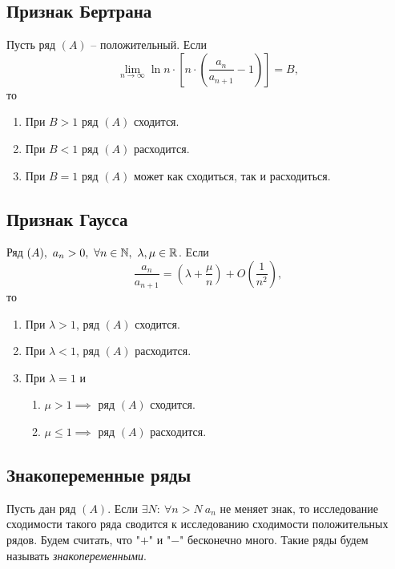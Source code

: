 \subsection{Признак Бертрана}

\begin{theorem}
    Пусть ряд $(A)$ -- положительный. Если
    \[
        \underset{n\rightarrow\infty}{\lim} \ln n \cdot \left[n \cdot (\frac{a_n}{a_{n+1}} - 1)\right] = B,
    \]
    то
    \begin{enumerate}
        \item При $B > 1$ ряд $(A)$ сходится.
        \item При $B < 1$ ряд $(A)$ расходится.
        \item При $B = 1$ ряд $(A)$ может как сходиться, так и расходиться.
    \end{enumerate}
\end{theorem}

\subsection{Признак Гаусса}

\begin{theorem}
    Ряд $(A), \ a_n > 0, \ \forall n \in \mathbb{N}, \ \lambda, \mu \in \mathbb{R}$. Если
    \[
        \frac{a_n}{a_{n+1}} = \left(\lambda + \frac{\mu}{n}\right) + O\left(\frac{1}{n^2}\right),
    \]
    то
    \begin{enumerate}
        \item При $\lambda > 1$, ряд $(A)$ сходится.
        \item При $\lambda < 1$, ряд $(A)$ расходится.
        \item При $\lambda = 1$ и \begin{enumerate}
                  \item $\mu > 1 \implies$ ряд $(A)$ сходится.
                  \item $\mu \leqslant 1 \implies$ ряд $(A)$ расходится.
              \end{enumerate}
    \end{enumerate}
\end{theorem}

\subsection{Знакопеременные ряды}

\begin{note}
    Пусть дан ряд $(A)$. Если $\exists N: \ \forall n > N \ a_n$ не меняет знак, то исследование сходимости такого ряда сводится к исследованию сходимости положительных рядов. Будем считать, что "$+$" и "$-$" бесконечно много. Такие ряды будем называть \emph{знакопеременными}.
\end{note}


